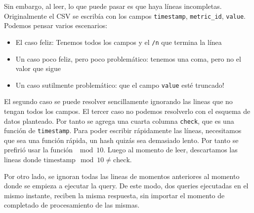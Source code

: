 \documentclass[titlepage,a4paper,oneside]{article}
\begin{document}
Sin embargo, al leer, lo que puede pasar es que haya líneas incompletas. Originalmente el CSV se escribía con los campos \texttt{timestamp}, \texttt{metric\_id}, \texttt{value}. Podemos pensar varios escenarios:
\begin{itemize}
	\item El caso feliz: Tenemos todos los campos y el \texttt{\slash n} que termina la línea
	\item Un caso poco feliz, pero poco problemático: tenemos una coma, pero no el valor que sigue
	\item Un caso sutilmente problemático: que el campo \texttt{value} esté truncado!
\end{itemize}

El segundo caso se puede resolver sencillamente ignorando las lineas que no tengan todos los campos. El tercer caso no podemos resolverlo con el esquema de datos planteado. Por tanto se agrega una cuarta columna \texttt{check}, que es una función de \texttt{timestamp}. Para poder escribir rápidamente las líneas, necesitamos que sea una función rápida, un hash quizás sea demasiado lento. Por tanto se prefirió usar la función $\mod 10$. Luego al momento de leer, descartamos las lineas donde $\text{timestamp} \mod 10 \neq \text{check}$.

Por otro lado, se ignoran todas las lineas de momentos anteriores al momento donde se empieza a ejecutar la query. De este modo, dos queries ejecutadas en el mismo instante, reciben la misma respuesta, sin importar el momento de completado de procesamiento de las mismas.

\printbibliography
\end{document}
